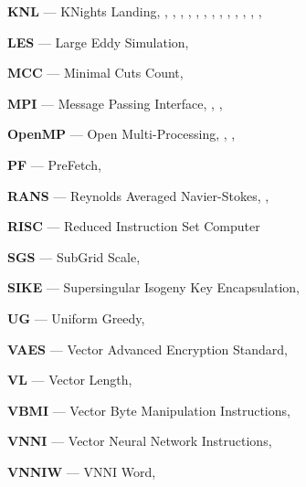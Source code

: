 \textbf{KNL} --- KNights Landing, \pageref{abbr:knl}, \pageref{abbr:knl2}, \pageref{abbr:knl3}, \pageref{abbr:knl4}, \pageref{abbr:knl5}, \pageref{abbr:knl6}, \pageref{abbr:knl7}, \pageref{abbr:knl8}, \pageref{abbr:knl9}, \pageref{abbr:knl10}, \pageref{abbr:knl11}, \pageref{abbr:knl12}, \pageref{abbr:knl13}, \pageref{abbr:knl14}

\textbf{LES} --- Large Eddy Simulation, \pageref{abbr:les}

\textbf{MCC} --- Minimal Cuts Count, \pageref{abbr:mcc}

\textbf{MPI} --- Message Passing Interface, \pageref{abbr:mpi}, \pageref{abbr:mpi2}, \pageref{abbr:mpi3}

\textbf{OpenMP} --- Open Multi-Processing, \pageref{abbr:openmp}, \pageref{abbr:openmp2}, \pageref{abbr:openmp3}

\textbf{PF} --- PreFetch, \pageref{abbr:pf}

\textbf{RANS} --- Reynolds Averaged Navier-Stokes, \pageref{abbr:rans}, \pageref{abbr:rans2}

\textbf{RISC} --- Reduced Instruction Set Computer

\textbf{SGS} --- SubGrid Scale, \pageref{abbr:sgs}

\textbf{SIKE} --- Supersingular Isogeny Key Encapsulation, \pageref{abbr:sike}

\textbf{UG} --- Uniform Greedy, \pageref{abbr:ug}

\textbf{VAES} --- Vector Advanced Encryption Standard, \pageref{abbr:vaes}

\textbf{VL} --- Vector Length, \pageref{abbr:vl}

\textbf{VBMI} --- Vector Byte Manipulation Instructions, \pageref{abbr:vbmi}

\textbf{VNNI} --- Vector Neural Network Instructions, \pageref{abbr:vnni}

\textbf{VNNIW} --- VNNI Word, \pageref{abbr:vnniw}
